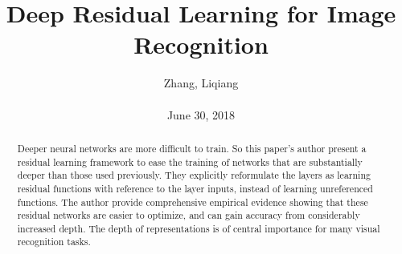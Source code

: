 \documentclass[10pt,twocolumn,letterpaper]{article}
\title{\textbf{Deep Residual Learning for Image Recognition}}
\author{Zhang, Liqiang\\\\June 30, 2018}
\begin{document}
\maketitle
\par
\begin{abstract}
  Deeper neural networks are more difficult to train. So this paper's author present a residual learning framework to ease the training of networks that are substantially deeper than those used previously. They explicitly reformulate the layers as learning residual functions with reference to the layer inputs, instead of learning unreferenced functions. The author provide comprehensive empirical evidence showing that these residual networks are easier to optimize, and can gain accuracy from considerably increased depth. The depth of representations is of central importance for many visual recognition tasks. 
\end{abstract}
\end{document}
